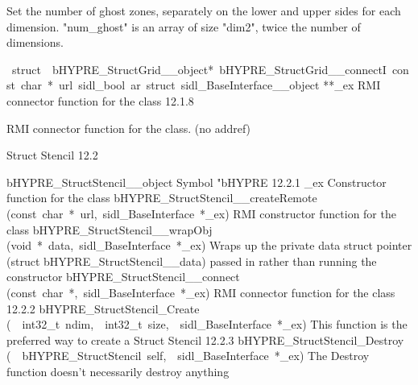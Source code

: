 \documentclass{article}
\begin{document}
\begin{cxxentry}
\begin{cxxentry}
\begin{cxxfunction}
\begin{cxxdoc}
Set the number of ghost zones, separately on the lower and upper sides
for each dimension.
"num\_ghost" is an array of size "dim2", twice the number of dimensions. 
\end{cxxdoc}
\end{cxxfunction}
\begin{cxxvariable}
{\ struct\ \ bHYPRE\_StructGrid\_\_object*\ bHYPRE\_StructGrid\_\_connectI\ const\ char\ *\ url\ sidl\_bool\ ar\ struct\ sidl\_BaseInterface\_\_object}
        {**\_ex}
        {}
        {
RMI connector function for the class}
        {12.1.8}
\begin{cxxdoc}

RMI connector function for the class. (no addref)
\end{cxxdoc}
\end{cxxvariable}
\end{cxxentry}
\begin{cxxentry}
{}
        {Struct Stencil}
        {}
        {
}
        {12.2}
\begin{cxxnames}
        {bHYPRE\_StructStencil\_\_object}
        {}
        {
Symbol "bHYPRE}
        {12.2.1}
        {\_ex}
        {}
        {
Constructor function for the class}
        {}
\label{cxx.12.2.9}
        {bHYPRE\_StructStencil\_\_createRemote}
        {(const\ char\ *\ url,\ sidl\_BaseInterface\ *\_ex)}
        {
RMI constructor function for the class}
        {}
\label{cxx.12.2.10}
        {bHYPRE\_StructStencil\_\_wrapObj}
        {(void\ *\ data,\ sidl\_BaseInterface\ *\_ex)}
        {
Wraps up the private data struct pointer (struct bHYPRE\_StructStencil\_\_data) passed in rather than running the constructor}
        {}
\label{cxx.12.2.11}
        {bHYPRE\_StructStencil\_\_connect}
        {(const\ char\ *,\ sidl\_BaseInterface\ *\_ex)}
        {
RMI connector function for the class}
        {12.2.2}
        {bHYPRE\_StructStencil\_Create}
        {(\ \ int32\_t\ ndim,\ \ int32\_t\ size,\ \ sidl\_BaseInterface\ *\_ex)}
        {
This function is the preferred way to create a Struct Stencil}
        {12.2.3}
        {bHYPRE\_StructStencil\_Destroy}
        {(\ \ bHYPRE\_StructStencil\ self,\ \ sidl\_BaseInterface\ *\_ex)}
        {
The Destroy function doesn't necessarily destroy anything}

\end{cxxnames}
\end{cxxentry}
\end{cxxentry}
\end{document}
